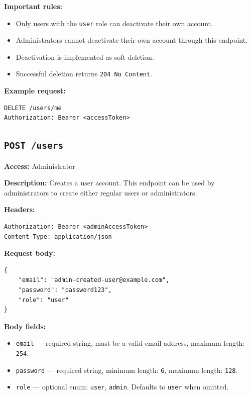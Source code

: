 \textbf{Important rules:}

\begin{itemize}
    \item Only users with the \texttt{user} role can deactivate their own account.
    \item Administrators cannot deactivate their own account through this endpoint.
    \item Deactivation is implemented as soft deletion.
    \item Successful deletion returns \texttt{204 No Content}.
\end{itemize}

\textbf{Example request:}

\begin{verbatim}
DELETE /users/me
Authorization: Bearer <accessToken>
\end{verbatim}

\pagebreak
\subsection{\texttt{POST /users}}

\textbf{Access:} Administrator

\textbf{Description:} Creates a user account. This endpoint can be used by administrators to create either regular users or administrators.

\textbf{Headers:}

\begin{verbatim}
Authorization: Bearer <adminAccessToken>
Content-Type: application/json
\end{verbatim}

\textbf{Request body:}

\begin{verbatim}
{
    "email": "admin-created-user@example.com",
    "password": "password123",
    "role": "user"
}
\end{verbatim}

\textbf{Body fields:}

\begin{itemize}
    \item \texttt{email} --- required string, must be a valid email address, maximum length: \texttt{254}.
    \item \texttt{password} --- required string, minimum length: \texttt{6}, maximum length: \texttt{128}.
    \item \texttt{role} --- optional enum: \texttt{user}, \texttt{admin}. Defaults to \texttt{user} when omitted.
\end{itemize}

